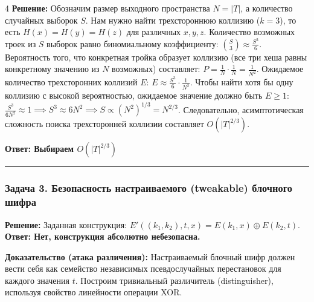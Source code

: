 ﻿\documentclass[8pt,a4paper,landscape]{extarticle}
\begin{document}
\begin{multicols*}{4}
\textbf{Решение:} Обозначим размер выходного пространства \(N = |T|\), а количество случайных выборок \(S\). Нам нужно найти трехстороннюю коллизию (\(k=3\)), то есть \(H(x) = H(y) = H(z)\) для различных \(x, y, z\). Количество возможных троек из \(S\) выборок равно биномиальному коэффициенту: \(\binom{S}{3} \approx \frac{S^3}{6}\). Вероятность того, что конкретная тройка образует коллизию (все три хеша равны конкретному значению из \(N\) возможных) составляет: \(P = \frac{1}{N} \cdot \frac{1}{N} = \frac{1}{N^2}\). Ожидаемое количество трехсторонних коллизий \(E\): \(E \approx \frac{S^3}{6} \cdot \frac{1}{N^2}\). Чтобы найти хотя бы одну коллизию с высокой вероятностью, ожидаемое значение должно быть \(E \ge 1\): \(\frac{S^3}{6N^2} \approx 1 \implies S^3 \approx 6N^2 \implies S \propto (N^2)^{1/3} = N^{2/3}\). Следовательно, асимптотическая сложность поиска трехсторонней коллизии составляет \(O(|T|^{2/3})\).

\textbf{Ответ: Выбираем \(O(|T|^{2/3})\)}

\begin{center}\rule{0.5\linewidth}{0.5pt}\end{center}

\subsubsection{Задача 3. Безопасность настраиваемого (tweakable) блочного шифра}\label{ux437ux430ux434ux430ux447ux430-3.-ux431ux435ux437ux43eux43fux430ux441ux43dux43eux441ux442ux44c-ux43dux430ux441ux442ux440ux430ux438ux432ux430ux435ux43cux43eux433ux43e-tweakable-ux431ux43bux43eux447ux43dux43eux433ux43e-ux448ux438ux444ux440ux430}

\textbf{Решение:} Заданная конструкция: \(E'((k_1,k_2), t, x) = E(k_1, x) \oplus E(k_2, t)\). \textbf{Ответ: Нет, конструкция абсолютно небезопасна.}

\textbf{Доказательство (атака различения):} Настраиваемый блочный шифр должен вести себя как семейство независимых псевдослучайных перестановок для каждого значения \(t\). Построим тривиальный различитель (distinguisher), используя свойство линейности операции XOR.


\end{multicols*}
\end{document}
